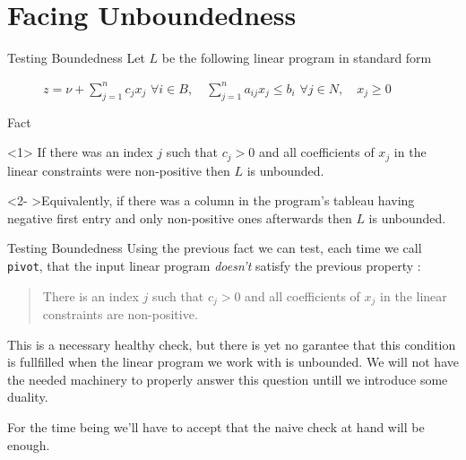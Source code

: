 \documentclass[aspectratio = 169]{beamer}
\begin{document}
\section{Facing Unboundedness}

\begin{frame}{Testing Boundedness}
    Let $L$ be the following linear program in standard form
    \begin{figure}
        \begin{linearProgG}{
            ${\displaystyle z = \nu + \sum_{j=1}^n c_jx_j}$
            }{
            ${\displaystyle \forall i \in B, \quad \sum_{j=1}^n a_{ij}x_j \leq b_i}$
            }{
            $\forall j \in N, \quad x_j \geq 0$
            }
        \end{linearProgG}
    \end{figure}
    \begin{halfshyblock}{Fact}
      \begin{onlyenv}<1>
        If there was an index $j$ such that $c_j > 0$ and all
        coefficients of $x_{j}$ in the linear constraints were
        non-positive then $L$ is unbounded.
      \end{onlyenv}
      \begin{onlyenv}<2-
        >\alert{Equivalently, if there was a column in the program's tableau
        having negative first entry and only non-positive ones
        afterwards then $L$ is unbounded.}
      \end{onlyenv}
    \end{halfshyblock}
\end{frame}

\begin{frame}{Testing Boundedness}
  Using the previous fact we can test, each time we call
  \texttt{pivot}, that the input linear program
  \alert{\emph{doesn't}} satisfy the previous property :
    \begin{quote}
      There is an index $j$ such that $c_j > 0$ and all coefficients
      of $x_j$ in the linear constraints are non-positive.
    \end{quote}
    \pause
    This is a necessary healthy check, but there is yet no garantee
    that this condition is fullfilled when the linear program we work
    with is unbounded. We will not have the needed machinery to
    properly answer this question untill we introduce some
    duality.

    \pause
    For the time being we'll have to accept that the naive
    check at hand will be enough.
\end{frame}
\end{document}
